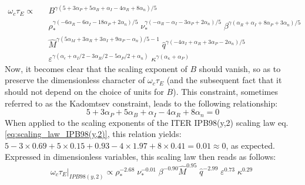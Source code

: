 \begin{eqnarray}
\label{eq:tauE_SL_generic_dimensionless}
\omega_c \tau_E \propto &&
B^{\gamma(5+3\alpha_P+5\alpha_B+\alpha_I-4\alpha_R+8\alpha_n)/5} \nonumber\\
&&
\rho_*^{\gamma(-6\alpha_R-6\alpha_I-18\alpha_P+2\alpha_n)/5} \;
\nu_*^{\gamma(-\alpha_R-\alpha_I-3\alpha_P+2\alpha_n)/5} \;
\beta^{\gamma(\alpha_R+\alpha_I+8\alpha_P+3\alpha_n)/5}  \nonumber\\
&&
\hat M^{\gamma(5\alpha_M+3\alpha_R+3\alpha_I+9\alpha_P-\alpha_n)/5 - 1}  \;
\hat q^{\gamma(-4\alpha_I+\alpha_R+3\alpha_P-2\alpha_n)/5}  \nonumber\\
&&
\varepsilon^{\gamma(\alpha_\epsilon+\alpha_I/2-3\alpha_R/2-5\alpha_P/2+\alpha_n)}  \;
\kappa^{\gamma(\alpha_\kappa+\alpha_P)} 
\end{eqnarray}
Now, it becomes clear that the scaling exponent of $B$ should vanish, so as to preserve the dimensionless character of $\omega_c \tau_E$ (and the subsequent fact that it should not depend on the choice of units for $B$). This constraint, sometimes referred to as the Kadomtsev constraint, leads to the following relationship:
$$
5+3\alpha_P+5\alpha_B+\alpha_I-4\alpha_R+8\alpha_n = 0
$$
When applied to the scaling exponents of the ITER IPB98(y,2) scaling law eq.\ref{eq:scaling_law_IPB98(y,2)}, this relation yields: $5-3\times 0.69+5\times0.15+0.93-4\times1.97+8\times0.41 = 0.01 \approx 0$, as expected. Expressed in dimensionless variables, this scaling law then reads as follows:
\begin{equation}
\label{eq:scaling_law_IPB98(y,2)_dimensionless}
\left. \omega_c \tau_E \right|_{IPB98(y,2)}\propto 
\rho_*^{-2.68} \;
\nu_*^{-0.01} \;
\beta^{-0.90} 
\hat M^{0.95} \;
\hat q^{-2.99}  \;
\varepsilon^{0.73}  \;
\kappa^{0.29} \;
\end{equation}
